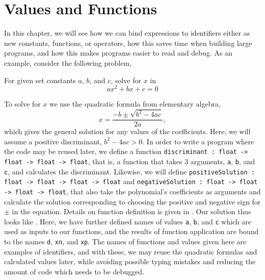 \chapter{Values and Functions}
\label{chap:let}
%
In this chapter, we will see how we can bind expressions to identifiers either as new constants, functions, or operators, how this saves time when building large programs, and how this makes programs easier to read and debug. As an example, consider the following problem,
\begin{problem}
  For given set constants $a$, $b$, and $c$, solve for $x$ in
  \begin{equation}
  a x^2+bx+c = 0
\end{equation}
\end{problem}
To solve for $x$ we use the quadratic formula from elementary algebra,
\begin{equation}
  x = \frac{-b\pm\sqrt{b^2-4ac}}{2a},
\end{equation}
which gives the general solution for any values of the coefficients. Here, we will assume a positive discriminant, $b^2-4ac>0$. In order to write a program where the code may be reused later, we define a function \mbox{\lstinline!discriminant : float -> float -> float -> float!}, that is, a function that takes 3 arguments, \lstinline!a!, \lstinline!b!, and \lstinline!c!, and calculates the discriminant. Likewise, we will define \mbox{\lstinline!positiveSolution : float -> float -> float -> float!} and \mbox{\lstinline!negativeSolution : float -> float -> float -> float!}, that also take the polynomial's coefficients as arguments and calculate the solution corresponding to choosing the positive and negative sign for $\pm$ in the equation. Details on function definition is given in . Our solution thus looks like .
%
%
Here, we have further defined names of values \lstinline!a!, \lstinline!b!, and \lstinline!c! which are used as inputs to our functions, and the results of function application are bound to the names \lstinline!d!, \lstinline!xn!, and \lstinline!xp!. The names of functions and values given here are examples of identifiers, and with these, we may reuse the quadratic formulas and calculated values later, while avoiding possible typing mistakes and reducing the amount of code which needs to be debugged.


